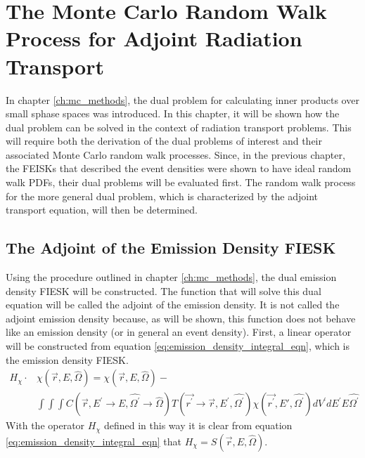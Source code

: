 \chapter{The Monte Carlo Random Walk Process for Adjoint Radiation Transport}
\label{ch:adjoint_particle_transport}
In chapter \ref{ch:mc_methods}, the dual problem for calculating inner products
over small sphase spaces was introduced. In this chapter, it will be shown how
the dual problem can be solved in the context of radiation transport 
problems. This will require both the derivation of the dual problems of interest
and their associated Monte Carlo random walk processes. Since, in the previous
chapter, the FEISKs that described the event densities were shown to have 
ideal random walk PDFs, their dual problems will be evaluated first. The 
random walk process for the more general dual problem, which is characterized
by the adjoint transport equation, will then be determined. 

\section{The Adjoint of the Emission Density FIESK}
Using the procedure outlined in chapter \ref{ch:mc_methods}, the dual emission
density FIESK will be constructed. The function that will solve this dual 
equation will be called the adjoint of the emission density. It is not called
the adjoint emission density because, as will be shown, this function does
not behave like an emission density (or in general an event density). First, 
a linear operator will be constructed from equation 
\ref{eq:emission_density_integral_eqn}, which is the emission density FIESK. 
\begin{equation}
  \begin{split}
    H_{\chi} \cdot &\chi(\vec{r},E,\hat{\Omega}) = 
    \chi(\vec{r},E,\hat{\Omega}) - \\
    & \int\int\int C(\vec{r},E^{'} \to E,\hat{\Omega^{'}} \to \hat{\Omega})
    T(\vec{r^{'}} \to \vec{r},E^{'},\hat{\Omega^{'}}) 
    \chi(\vec{r^{'}},E',\hat{\Omega^{'}}) dV^{'}dE^{'}E\hat{\Omega^{'}}
  \end{split}
\end{equation}
With the operator $H_{\chi}$ defined in this way it is clear from equation
\ref{eq:emission_density_integral_eqn} that 
$H_{\chi} = S(\vec{r},E,\hat{\Omega})$.

